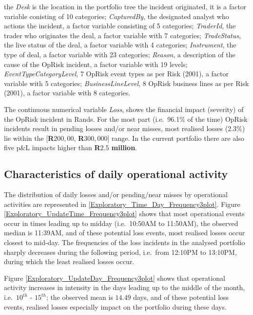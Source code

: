 \documentclass{DissertateUSU}
\begin{document}
the \emph{Desk} is the location in the portfolio tree the incident
originated, it is a factor variable conisting of 10 categories;
\emph{CapturedBy}, the designated analyst who actions the incident, a
factor variable consisting of 5 categories; \emph{TraderId}, the trader
who originates the deal, a factor variable with 7 categories;
\emph{TradeStatus}, the live status of the deal, a factor variable with
4 categories; \emph{Instrument}, the type of deal, a factor variable
with 23 categories; \emph{Reason}, a description of the cause of the
OpRisk incident, a factor variable with 19 levels;
\emph{EventTypeCategoryLevel}, 7 OpRisk event types as per Risk (2001),
a factor variable with 5 categories; \emph{BusinessLineLevel}, 8 OpRisk
business lines as per Risk (2001), a factor variable with 8
categories.\medskip

\singlespacing

\doublespacing

The continuous numerical variable \emph{Loss}, shows the financial
impact (severity) of the OpRisk incident in Rands. For the most part
(i.e.~96.1\% of the time) OpRisk incidents result in pending losses
and/or near misses, most realised losses (2.3\%) lie within the
{[}\textbf{R$200,00$}, \textbf{R$300,000$}{]} range. In the current
portfolio there are also five p\&L impacts higher than
\textbf{R$2.5$ million}.\medskip

\subsection{Characteristics of daily operational activity}

The distribution of daily losses and/or pending/near misses by
operational activities are represented in
\ref{Exploratory_Time_Day_Frequency3plot}. Figure
\ref{Exploratory_UpdateTime_Frequency3plot} shows that most operational
events occur in times leading up to midday (i.e.~10:50AM to 11:50AM),
the observed median is 11:39AM, and of these potential loss events, most
realised losses occur closest to mid-day. The frequencies of the loss
incidents in the analysed portfolio sharply decreases during the
following period, i.e.~from 12:10PM to 13:10PM, during which the least
realised losses occur.\medskip

Figure \ref{Exploratory_UpdateDay_Frequency3plot} shows that operational
activity increases in intensity in the days leading up to the middle of
the month, i.e.~\(10^{th}\) - \(15^{th}\); the observed mean is
\(14.49\) days, and of these potential loss events, realised losses
especially impact on the portfolio during these days.
\end{document}
